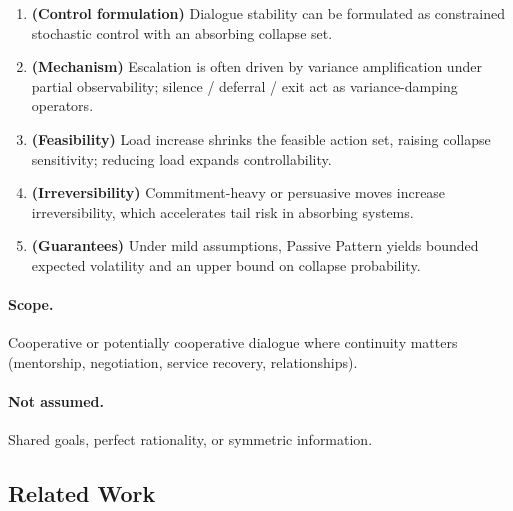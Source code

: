 \begin{enumerate}
\item \textbf{(Control formulation)} Dialogue stability can be
formulated as constrained stochastic control with an absorbing
collapse set.
\item \textbf{(Mechanism)} Escalation is often driven by variance
amplification under partial observability; silence / deferral / exit
act as variance-damping operators.
\item \textbf{(Feasibility)} Load increase shrinks the feasible
action set, raising collapse sensitivity; reducing load expands
controllability.
\item \textbf{(Irreversibility)} Commitment-heavy or persuasive
moves increase irreversibility, which accelerates tail risk in
absorbing systems.
\item \textbf{(Guarantees)} Under mild assumptions, Passive Pattern
yields bounded expected volatility and an upper bound on collapse
probability.
\end{enumerate}

\paragraph{Scope.}
Cooperative or potentially cooperative dialogue where continuity
matters (mentorship, negotiation, service recovery, relationships).

\paragraph{Not assumed.}
Shared goals, perfect rationality, or symmetric information.

\subsection{Related Work}
\label{sec:pp-related-work}

